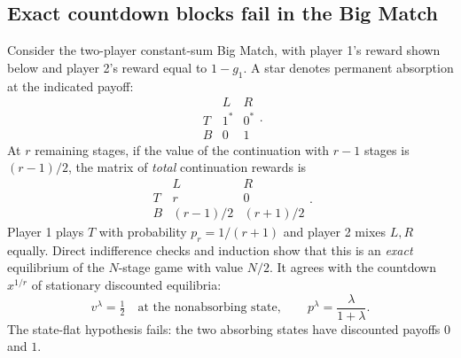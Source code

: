 \documentclass[11pt,a4paper]{article}
\numberwithin{equation}{section}
\theoremstyle{definition}
\theoremstyle{remark}
\begin{document}
\subsection{Exact countdown blocks fail in the Big Match}
\label{sec:bigmatch}
Consider the two-player constant-sum Big Match, with player 1's reward
shown below and player 2's reward equal to $1-g_1$. A star denotes
permanent absorption at the indicated payoff:
\begin{equation}\label{eq:BM}
\begin{array}{c|cc}
 & L&R\\\hline
 T&1^{*}&0^{*}\\
 B&0&1
\end{array}.
\end{equation}
At $r$ remaining stages, if the value of the continuation with $r-1$
stages is $(r-1)/2$, the matrix of \emph{total} continuation rewards is
\[
\begin{array}{c|cc}
 &L&R\\\hline
 T&r&0\\
 B&(r-1)/2&(r+1)/2
\end{array}.
\]
Player 1 plays $T$ with probability $p_r=1/(r+1)$ and player 2 mixes
$L,R$ equally. Direct indifference checks and induction show that this is
an \emph{exact} equilibrium of the $N$-stage game with value $N/2$.
It agrees with the countdown $x^{1/r}$ of stationary discounted equilibria:
\[
 v^\lambda=\tfrac12\quad\text{at the nonabsorbing state},
 \qquad p^\lambda=\frac{\lambda}{1+\lambda}.
\]
The state-flat hypothesis fails: the two absorbing states have discounted
payoffs $0$ and $1$.
\end{document}
